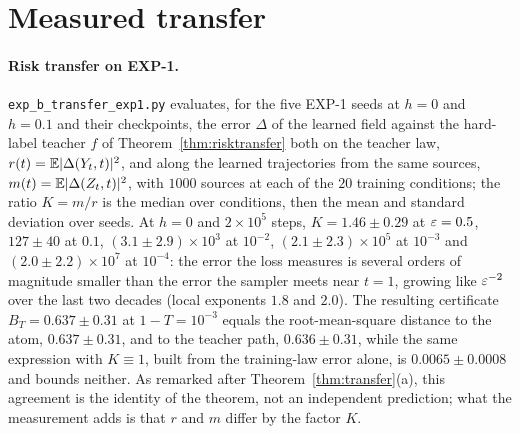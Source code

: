 \documentclass{article} %
\theoremstyle{plain}
\theoremstyle{definition}
\theoremstyle{remark}
\begin{document}
\section{Measured transfer}
\label{app:measured-transfer}

\paragraph{Risk transfer on EXP-1.} \texttt{exp\_b\_transfer\_exp1.py} evaluates, for the five
EXP-1 seeds at $h=0$ and $h=0.1$ and their checkpoints, the error $\Delta$ of the learned field
against the hard-label teacher $f$ of Theorem~\ref{thm:risktransfer} both on the teacher law,
$r(t)=\mathbb{E}|\Delta(Y_t,t)|^2$, and along the learned trajectories from the same sources,
$m(t)=\mathbb{E}|\Delta(Z_t,t)|^2$, with $1000$ sources at each of the $20$ training conditions; the
ratio $K=m/r$ is the median over conditions, then the mean and standard deviation over seeds. At
$h=0$ and $2\times10^5$ steps, $K=1.46\pm0.29$ at $\varepsilon=0.5$, $127\pm40$ at $0.1$,
$(3.1\pm2.9)\times10^3$ at $10^{-2}$, $(2.1\pm2.3)\times10^5$ at $10^{-3}$ and
$(2.0\pm2.2)\times10^7$ at $10^{-4}$: the error the loss measures is several orders of magnitude
smaller than the error the sampler meets near $t=1$, growing like $\varepsilon^{-2}$ over the last two decades
(local exponents $1.8$ and $2.0$). The
resulting certificate $B_T=0.637\pm0.31$ at $1-T=10^{-3}$ equals the root-mean-square distance
to the atom, $0.637\pm0.31$, and to the teacher path, $0.636\pm0.31$, while the same expression
with $K\equiv1$, built from the training-law error alone, is $0.0065\pm0.0008$ and bounds neither. As remarked after
Theorem~\ref{thm:transfer}(a), this agreement is the identity of the theorem, not an independent
prediction; what the measurement adds is that $r$ and $m$ differ by the factor $K$.
\end{document}
